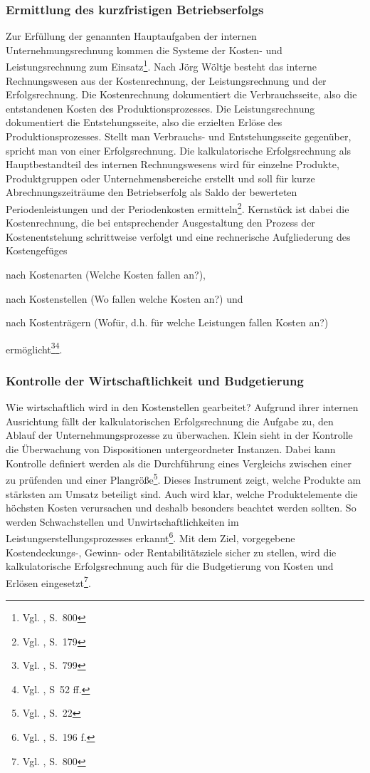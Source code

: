 \subsubsection{Ermittlung des kurzfristigen Betriebserfolgs}
Zur Erfüllung der genannten Hauptaufgaben der internen Unternehmungsrechnung kommen die Systeme der Kosten- und Leistungsrechnung zum Einsatz\footnote{Vgl. \cite{Schierenbeck2008}, S.~800}. Nach Jörg Wöltje besteht das interne Rechnungswesen aus der Kostenrechnung, der Leistungsrechnung und der Erfolgsrechnung. Die Kostenrechnung dokumentiert die Verbrauchsseite, also die entstandenen Kosten des Produktionsprozesses. Die Leistungsrechnung dokumentiert die Entstehungsseite, also die erzielten Erlöse des Produktionsprozesses. Stellt man Verbrauchs- und Entstehungsseite gegenüber, spricht man von einer Erfolgsrechnung. Die kalkulatorische Erfolgsrechnung als Hauptbestandteil des internen Rechnungswesens wird für einzelne Produkte, Produktgruppen oder Unternehmensbereiche erstellt und soll für kurze Abrechnungszeiträume den Betriebserfolg als Saldo der bewerteten Periodenleistungen und der Periodenkosten ermitteln\footnote{Vgl. \cite{Woltje2008}, S.~179}.
Kernstück ist dabei die Kostenrechnung, die bei entsprechender Ausgestaltung den Prozess der Kostenentstehung schrittweise verfolgt und eine rechnerische Aufgliederung des Kostengefüges 
\begin{compactitem}
\item nach Kostenarten (Welche Kosten fallen an?), 
\item nach Kostenstellen (Wo fallen welche Kosten an?) und 
\item nach Kostenträgern (Wofür, d.h. für welche Leistungen fallen Kosten an?)
\end{compactitem} ermöglicht\footnote{Vgl. \cite{Schierenbeck2008}, S.~799}\footnote{Vgl. \cite{Ossadnik2008}, S~52 ff.}.


\subsubsection{Kontrolle der Wirtschaftlichkeit und Budgetierung}
Wie wirtschaftlich wird in den Kostenstellen gearbeitet?
Aufgrund ihrer internen Ausrichtung fällt der kalkulatorischen Erfolgsrechnung die Aufgabe zu, den Ablauf der Unternehmungsprozesse zu überwachen. Klein sieht in der Kontrolle die Überwachung von Dispositionen untergeordneter Instanzen. Dabei kann Kontrolle definiert werden als die \glqq Durchführung eines Vergleichs zwischen einer zu prüfenden und einer Plangröße\grqq \footnote{Vgl. \cite{Klein1999}, S.~22}.
Dieses Instrument zeigt, welche Produkte am stärksten am Umsatz beteiligt sind. Auch wird klar, welche Produktelemente die höchsten Kosten verursachen und deshalb besonders beachtet werden sollten. So werden Schwachstellen und Unwirtschaftlichkeiten im Leistungserstellungsprozesses erkannt\footnote{Vgl. \cite{Woltje2008}, S.~196 f.}. Mit dem Ziel, vorgegebene Kostendeckungs-, Gewinn- oder Rentabilitätsziele sicher zu stellen, wird die kalkulatorische Erfolgsrechnung auch für die Budgetierung von Kosten und Erlösen eingesetzt\footnote{Vgl. \cite{Schierenbeck2008}, S.~800}.

